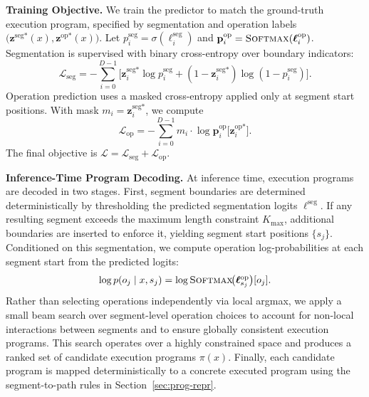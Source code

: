 \documentclass{article}
\theoremstyle{plain}
\theoremstyle{definition}
\theoremstyle{remark}
\begin{document}
\textbf{Training Objective.}
We train the predictor to match the ground-truth execution program,
specified by segmentation and operation labels $\big(\mathbf{z}^{\text{seg}*}(x),\mathbf{z}^{\text{op}*}(x)\big)$.
Let $p^{\text{seg}}_i=\sigma(\ell^{\text{seg}}_i)$ and
$\mathbf{p}^{\text{op}}_i=\textsc{Softmax}(\boldsymbol{\ell}^{\text{op}}_i)$.
Segmentation is supervised with binary cross-entropy over boundary indicators:
\begingroup
\setlength{\abovedisplayskip}{2pt}
\setlength{\belowdisplayskip}{2pt}
\[
\textstyle
\mathcal{L}_{\text{seg}}
=
-\sum_{i=0}^{D-1}\Big[
\mathbf{z}^{\text{seg}*}_i\log p^{\text{seg}}_i
+(1-\mathbf{z}^{\text{seg}*}_i)\log(1-p^{\text{seg}}_i)
\Big].
\]
\endgroup
Operation prediction uses a masked cross-entropy applied only at segment start positions.
With mask $m_i=\mathbf{z}^{\text{seg}*}_i$, we compute
\begingroup
\setlength{\abovedisplayskip}{0pt}
\setlength{\belowdisplayskip}{0pt}
\[
\textstyle
\mathcal{L}_{\text{op}}
=
-\sum_{i=0}^{D-1}
m_i\cdot
\log \mathbf{p}^{\text{op}}_i\big[\mathbf{z}^{\text{op}*}_i\big].
\]
\endgroup
The final objective is $\mathcal{L}=\mathcal{L}_{\text{seg}}+\mathcal{L}_{\text{op}}.$


\textbf{Inference-Time Program Decoding.}
At inference time, execution programs are decoded in two stages.
First, segment boundaries are determined deterministically by thresholding the
predicted segmentation logits $\boldsymbol{\ell}^{\text{seg}}$.
If any resulting segment exceeds the maximum length constraint $K_{\max}$,
additional boundaries are inserted to enforce it, yielding segment start positions $\{s_j\}$.
Conditioned on this segmentation, we compute operation log-probabilities at each
segment start from the predicted logits:
\begingroup
\setlength{\abovedisplayskip}{2pt}
\setlength{\belowdisplayskip}{2pt}
\[
\textstyle
\log p(o_j \mid x, s_j)
=
\log \textsc{Softmax}\!\big(\boldsymbol{\ell}^{\text{op}}_{s_j}\big)[o_j].
\]
\endgroup
Rather than selecting operations independently via local argmax, we apply a small
beam search over segment-level operation choices to account for non-local interactions
between segments and to ensure globally consistent execution programs.
This search operates over a highly constrained space and produces a ranked set of
candidate execution programs $\pi(x)$.
Finally, each candidate program is mapped deterministically to a concrete executed
program using the segment-to-path rules in Section~\ref{sec:prog-repr}.
\end{document}
